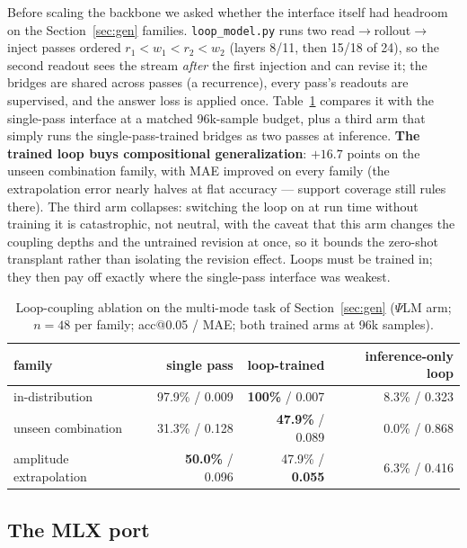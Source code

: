 \documentclass[11pt]{article}
\newcommand{\psilm}{$\Psi$LM}
\newcommand{\code}[1]{\texttt{#1}}
\begin{document}
Before scaling the backbone we asked whether the interface itself had headroom on the Section~\ref{sec:gen} families. \code{loop\_model.py} runs two read$\to$rollout$\to$inject passes ordered $r_1<w_1<r_2<w_2$ (layers 8/11, then 15/18 of 24), so the second readout sees the stream \emph{after} the first injection and can revise it; the bridges are shared across passes (a recurrence), every pass's readouts are supervised, and the answer loss is applied once. Table~\ref{tab:loop} compares it with the single-pass interface at a matched 96k-sample budget, plus a third arm that simply runs the single-pass-trained bridges as two passes at inference. \textbf{The trained loop buys compositional generalization}: $+16.7$ points on the unseen combination family, with MAE improved on every family (the extrapolation error nearly halves at flat accuracy --- support coverage still rules there). The third arm collapses: switching the loop on at run time without training it is catastrophic, not neutral, with the caveat that this arm changes the coupling depths and the untrained revision at once, so it bounds the zero-shot transplant rather than isolating the revision effect. Loops must be trained in; they then pay off exactly where the single-pass interface was weakest.

\begin{table}[t]
\centering
\caption{Loop-coupling ablation on the multi-mode task of Section~\ref{sec:gen} (\psilm{} arm; $n{=}48$ per family; acc@0.05 / MAE; both trained arms at 96k samples).}
\label{tab:loop}
\small
\begin{tabular}{lrrr}
\toprule
family & single pass & loop-trained & inference-only loop \\
\midrule
in-distribution & 97.9\% / 0.009 & \textbf{100\%} / 0.007 & 8.3\% / 0.323 \\
unseen combination & 31.3\% / 0.128 & \textbf{47.9\%} / 0.089 & 0.0\% / 0.868 \\
amplitude extrapolation & \textbf{50.0\%} / 0.096 & 47.9\% / \textbf{0.055} & 6.3\% / 0.416 \\
\bottomrule
\end{tabular}
\end{table}

\subsection{The MLX port}
\label{sec:mlx}
\end{document}
